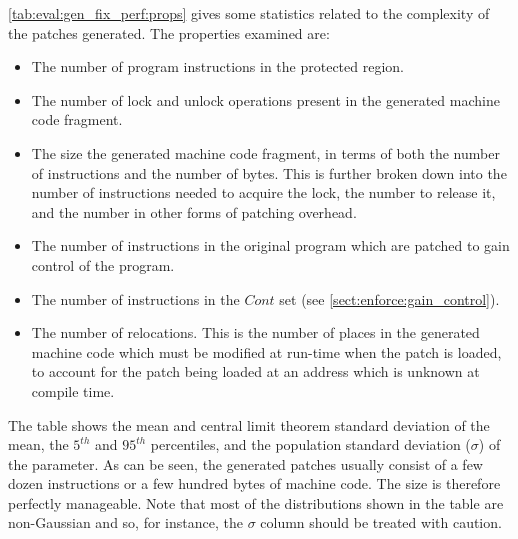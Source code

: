 \autoref{tab:eval:gen_fix_perf:props} gives some statistics related to
the complexity of the patches generated.  The properties examined are:

\begin{itemize}
\item The number of program instructions in the protected region.
\item The number of lock and unlock operations present in the
  generated machine code fragment.
\item The size the generated machine code fragment, in terms of both
  the number of instructions and the number of bytes.  This is further
  broken down into the number of instructions needed to acquire the
  lock, the number to release it, and the number in other forms of
  patching overhead.
\item The number of instructions in the original program which are
  patched to gain control of the program.
\item The number of instructions in the $\mathit{Cont}$ set (see
  \autoref{sect:enforce:gain_control}).
\item The number of relocations.  This is the number of places in the
  generated machine code which must be modified at run-time when the
  patch is loaded, to account for the patch being loaded at an address
  which is unknown at compile time.
\end{itemize}

The table shows the mean and central limit theorem standard deviation
of the mean, the $5^{th}$ and $95^{th}$ percentiles, and the
population standard deviation ($\sigma$) of the parameter.  As can be
seen, the generated patches usually consist of a few dozen
instructions or a few hundred bytes of machine code.  The size is
therefore perfectly manageable.  Note that most of the distributions
shown in the table are non-Gaussian and so, for instance, the $\sigma$
column should be treated with caution.

